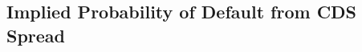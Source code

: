 %
%
%
%
%
%
%
%
%
%
%

\subsection{Implied Probability of Default from CDS Spread}
\label{default-probabilities-and-cds-spread}


